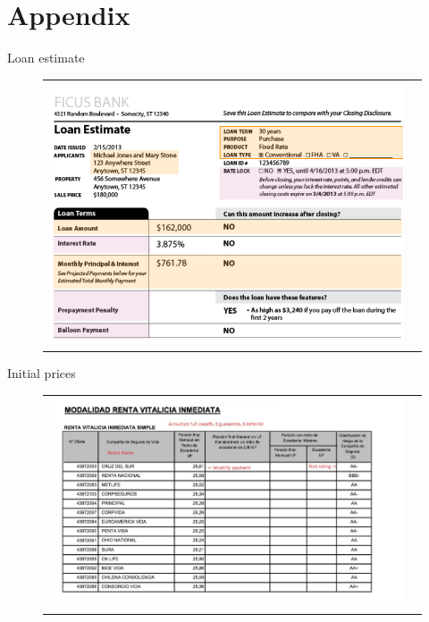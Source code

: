 \documentclass[10pt,aspectratio=169]{beamer}
\begin{document}
\section{Appendix}


\begin{frame}{Loan estimate}\label{slide:fig_LE}    
\begin{figure}[H]
\centering{}%
\begin{tabular}{cc}
\includegraphics[scale=0.42]{../figures/docs_screenshots/Loan Estimate_cut.png}
\end{tabular}
\end{figure}
\hyperlink{slide:motivation}{}
\end{frame}





\begin{frame}{Initial prices}\label{slide:fig_offer_certificate}    
\begin{figure}[H]
\centering{}%
\begin{tabular}{cc}
\includegraphics[scale=0.49]{../figures/docs_screenshots/annuity_offer.png}
\end{tabular}
\end{figure}
\hyperlink{slide:setting2}{} 
\hyperlink{slide:data}{}
\end{frame}
\end{document}
